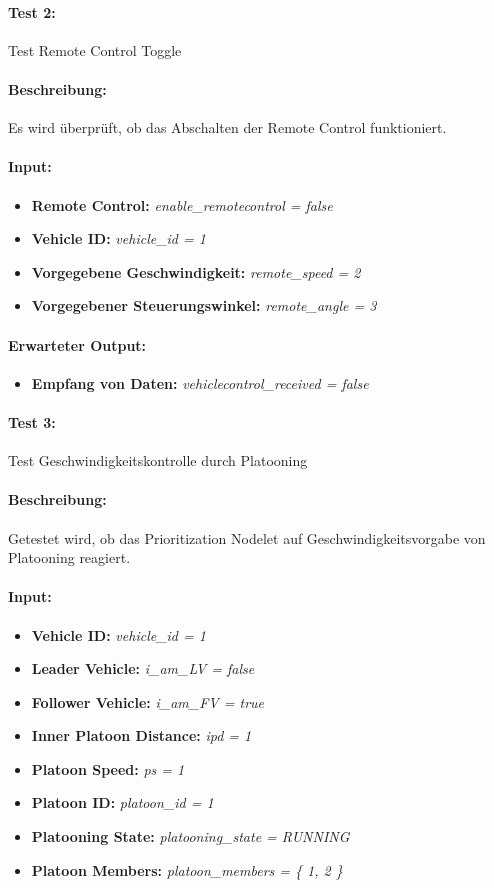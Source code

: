 \documentclass[a4paper, 12pt, titlepage]{scrartcl}
\begin{document}
				\paragraph{Test 2:}{Test Remote Control Toggle}
				\paragraph{Beschreibung:} Es wird überprüft, ob das Abschalten der Remote Control funktioniert.
				\paragraph{Input:}
				\begin{itemize} \itemsep-0.5em
					\item \textbf{Remote Control:} \emph{enable\_remotecontrol = false}
					\item \textbf{Vehicle ID:} \emph{vehicle\_id = 1}
					\item \textbf{Vorgegebene Geschwindigkeit:} \emph{remote\_speed = 2}
					\item \textbf{Vorgegebener Steuerungswinkel:} \emph{remote\_angle = 3}
				\end{itemize}
				\paragraph{Erwarteter Output:}
				\begin{itemize} \itemsep-0.5em
					\item \textbf{Empfang von Daten:} \emph{vehiclecontrol\_received = false}
				\end{itemize}

				\paragraph{Test 3:} {Test Geschwindigkeitskontrolle durch Platooning}
				\paragraph{Beschreibung:} Getestet wird, ob das Prioritization Nodelet auf Geschwindigkeitsvorgabe von Platooning reagiert.
				\paragraph{Input:}
				\begin{itemize} \itemsep-0.5em
					\item \textbf{Vehicle ID:} \emph{vehicle\_id = 1}
					\item \textbf{Leader Vehicle:} \emph{i\_am\_LV = false}
					\item \textbf{Follower Vehicle:} \emph{i\_am\_FV = true}
					\item \textbf{Inner Platoon Distance:} \emph{ipd = 1}
					\item \textbf{Platoon Speed:} \emph{ps = 1}
					\item \textbf{Platoon ID:} \emph{platoon\_id = 1}
					\item \textbf{Platooning State:} \emph{platooning\_state = RUNNING}
					\item \textbf{Platoon Members:} \emph{platoon\_members = \{ 1, 2 \}}
				\end{itemize}
\end{document}
